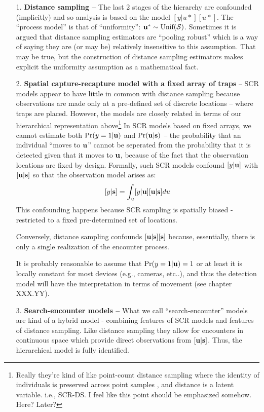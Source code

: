 \begin{itemize}
\item[1.] {\bf Distance sampling -- } The last 2 stages of the hierarchy
  are confounded (implicitly) and so analysis is based on the model
  $[y|u*] [u*]$. The ``process model'' is that of ``uniformity'': ${\bf u}^{*}
  \sim \text{Unif}({\cal S})$. Sometimes it is argued that distance sampling
  estimators are ``pooling robust'' which is a way of saying they are
  (or may be)
  relatively insensitive to this assumption. That may be true, but the
  construction of distance sampling estimators makes explicit the
  uniformity assumption as a mathematical fact.

\item[2.] {\bf Spatial capture-recapture model with a fixed array of traps} --
SCR models appear to have little in common with distance sampling
because observations are made only at a pre-defined set of discrete
locations -- where traps are placed. However, the models are closely
related in terms of our hierarchical representation above\footnote{Really
they're kind of like point-count distance sampling where the identity
of individuals is preserved across point samples , and distance is a
latent variable. i.e., SCR-DS. I feel like this point should be
emphasized somehow. Here? Later?}
In SCR models based on fixed arrays,
we cannot estimate both
$\Pr(y=1|{\bf u})$ and $\Pr({\bf u}|{\bf s})$ -- the probability  that
an individual ``moves to ${\bf u}$'' cannot be seperated from the
probability that it is detected given that it moves to ${\bf u}$,
because of the fact that the observation locations are fixed by
design.
Formally, such SCR models confound $[y|{\bf u}]$  with $[{\bf
  u}|{\bf s}]$ so that the observation model arises as:
\[
 [y|{\bf s}] = \int_{u} [y|{\bf u}][{\bf u}|{\bf s}] du
\]
This confounding happens because SCR sampling is spatially biased -
restricted to a fixed pre-determined set of locations.

Conversely,
distance sampling confounds $[{\bf u}|{\bf s}][{\bf s}]$ because, essentially, there is
only a single realization of the encounter process.

It is probably
reasonable to assume that $\Pr(y=1|{\bf u})=1$ or at least it is locally
constant for most devices (e.g., cameras, etc..), and thus the
detection model will have the interpretation in terms of movement (see
chapter XXX.YY).

\item[3.] {\bf Search-encounter models -- } What we call
  ``search-encounter'' models \citep{royle_etal:2011mee}
  are kind of a hybrid model - combining features of SCR models and
  features of distance sampling. Like distance sampling they allow for
  encounters in continuous space which provide direct observations
  from $[{\bf u}|{\bf s}]$.
Thus, the
  hierarchical model is fully identified.


\end{itemize}
